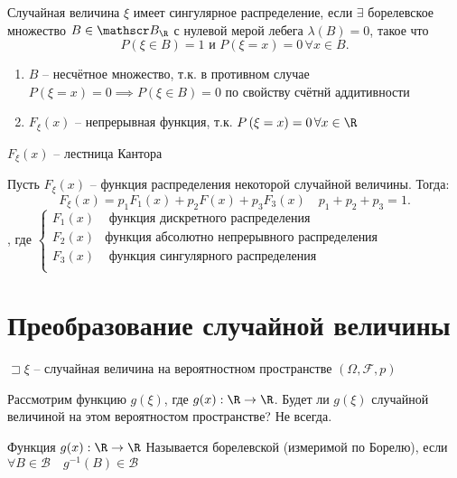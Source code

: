 \begin{definition}
    Случайная величина $\xi$ имеет сингулярное распределение, если  $\exists $ борелевское множество $B\in \mathscr B_\R$ с нулевой мерой лебега $\lambda(B) = 0$, такое что 
     \[
         P\left( \xi \in B \right)  = 1 \text{ и } P\left( \xi = x \right)  = 0\,\forall x\in B
    .\] 
\end{definition}
\begin{property}
    \begin{enumerate}
        \item $B$ -- несчётное множество, т.к. в противном случае $P\left( \xi = x \right)  = 0\implies P\left( \xi\in B \right)  = 0$ по свойству счётнй аддитивности
        \item $F_\xi (x)$ -- непрерывная функция, т.к.  $P\left( \xi = x \right)  = 0\,\forall x\in \R$
    \end{enumerate}
\end{property}

\begin{example}
    $F_\xi(x)$ -- лестница Кантора
\end{example}

\begin{theorem}
    [Лебега]

    Пусть $F_\xi(x)$ --  функция распределения некоторой случайной величины. Тогда:
    \[
        F_\xi (x) = p_1F_1(x) + p_2F(x) + p_3F_3(x)\quad p_1+p_2+p_3 = 1
    .\] , где $\begin{cases}
    F_1(x) & \text{ функция дискретного распределения}\\
    F_2(x) & \text{функция абсолютно непрерывного распределения}\\
    F_3(x) & \text{ функция сингулярного распределения}\\
    \end{cases}$
\end{theorem}

\section{Преобразование случайной величины}

$\sqsupset \xi$ -- случайная величина на вероятностном пространстве $(\Omega, \mathscr F, p)$ 

Рассмотрим функцию $g(\xi)$, где  $g(x):\R\to \R$. Будет ли $g(\xi)$ случайной величиной на этом вероятностом пространстве? Не всегда.

\begin{definition}
    Функция $g(x):\R\to \R$ Называется борелевской (измеримой по Борелю), если $\forall B\in \mathscr B\quad g^{-1}(B)\in \mathscr B$
\end{definition}

